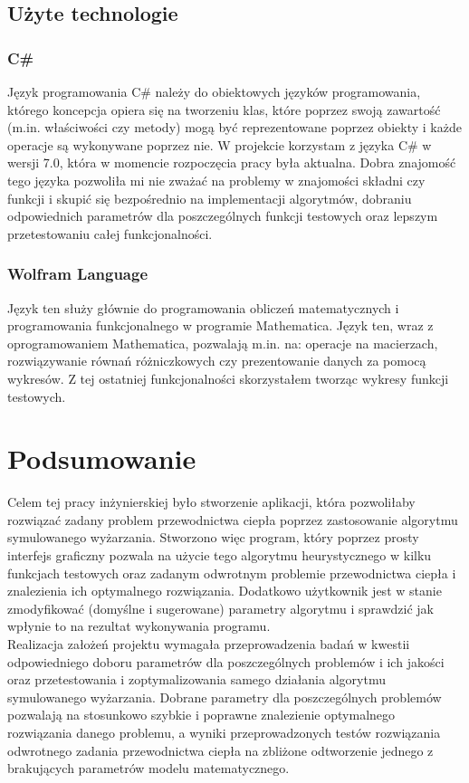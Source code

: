 \documentclass[twoside]{projektInzynierskiMS1}
\newcommand{\si}{ś}
\begin{document}
	\subsection{Użyte technologie}
	\subsubsection{C\#}
Język programowania C\# należy do obiektowych języków programowania, którego koncepcja opiera się na tworzeniu klas, które poprzez swoją zawarto\si ć (m.in. wła\si ciwo\si ci czy metody) mogą być reprezentowane poprzez obiekty i każde operacje są wykonywane poprzez nie. W projekcie korzystam z języka C\# w wersji 7.0, która w momencie rozpoczęcia pracy była aktualna. Dobra znajomo\si ć tego języka pozwoliła mi nie zważać na problemy w znajomo\si ci składni czy funkcji i skupić się bezpo\si rednio na implementacji algorytmów, dobraniu odpowiednich parametrów dla poszczególnych funkcji testowych oraz lepszym przetestowaniu całej funkcjonalno\si ci.

\subsubsection{Wolfram Language}
Język ten służy głównie do programowania obliczeń matematycznych i programowania funkcjonalnego w programie Mathematica. Język ten, wraz z oprogramowaniem Mathematica, pozwalają m.in. na: operacje na macierzach, rozwiązywanie równań różniczkowych czy prezentowanie danych za pomocą wykresów. Z tej ostatniej funkcjonalno\si ci skorzystałem tworząc wykresy funkcji testowych.

\section{Podsumowanie}
Celem tej pracy inżynierskiej było stworzenie aplikacji, która pozwoliłaby rozwiązać zadany problem przewodnictwa ciepła poprzez zastosowanie algorytmu symulowanego wyżarzania. Stworzono więc program, który poprzez prosty interfejs graficzny pozwala na użycie tego algorytmu heurystycznego w kilku funkcjach testowych oraz zadanym odwrotnym problemie przewodnictwa ciepła i znalezienia ich optymalnego rozwiązania. Dodatkowo użytkownik jest w stanie zmodyfikować (domy\si lne i sugerowane) parametry algorytmu i sprawdzić jak wpłynie to na rezultat wykonywania programu. \\

Realizacja założeń projektu wymagała przeprowadzenia badań w kwestii odpowiedniego doboru parametrów dla poszczególnych problemów i ich jako\si ci oraz przetestowania i zoptymalizowania samego działania algorytmu symulowanego wyżarzania. Dobrane parametry dla poszczególnych problemów pozwalają na stosunkowo szybkie i poprawne znalezienie optymalnego rozwiązania danego problemu, a wyniki przeprowadzonych testów rozwiązania odwrotnego zadania przewodnictwa ciepła na zbliżone odtworzenie jednego z brakujących parametrów modelu matematycznego. \\
\end{document}
